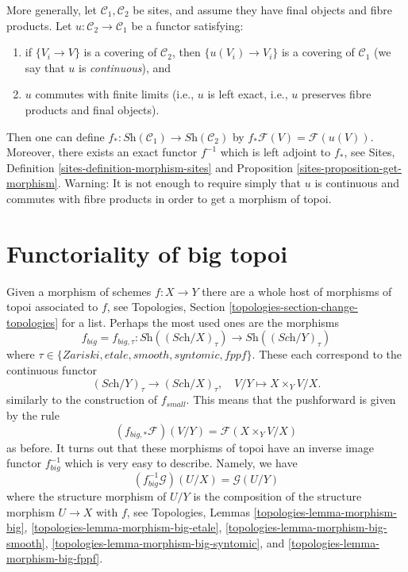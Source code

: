 \begin{remark}
\label{remark-functoriality-general}
More generally, let $\mathcal{C}_1, \mathcal{C}_2$ be sites, and
assume they have final objects and fibre products. Let
$u: \mathcal{C}_2 \to \mathcal{C}_1$ be a functor satisfying:
\begin{enumerate}
\item if $\{V_i \to V\}$ is a covering of $\mathcal{C}_2$, then
$\{u(V_i) \to V_i\}$ is a covering of $\mathcal{C}_1$ (we
say that $u$ is {\it continuous}), and
\item $u$ commutes with finite limits (i.e., $u$ is left exact, i.e.,
$u$ preserves fibre products and final objects).
\end{enumerate}
Then one can define
$f_*: \textit{Sh}(\mathcal{C}_1) \to \textit{Sh}(\mathcal{C}_2)$
by $ f_* \mathcal{F}(V) = \mathcal{F}(u(V))$.
Moreover, there exists an exact functor $f^{-1}$ which
is left adjoint to $f_*$, see
Sites, Definition \ref{sites-definition-morphism-sites} and
Proposition \ref{sites-proposition-get-morphism}.
Warning: It is not enough to require simply that $u$ is continuous
and commutes with fibre products in order to get a morphism of topoi.
\end{remark}




\section{Functoriality of big topoi}
\label{section-functoriality-big-topoi}

\noindent
Given a morphism of schemes $f : X \to Y$ there are a whole host of
morphisms of topoi associated to $f$, see
Topologies, Section \ref{topologies-section-change-topologies}
for a list. Perhaps the most used ones are the morphisms
$$
f_{big} = f_{big, \tau} :
\textit{Sh}((\textit{Sch}/X)_\tau)
\longrightarrow
\textit{Sh}((\textit{Sch}/Y)_\tau)
$$
where $\tau \in \{Zariski, etale, smooth, syntomic, fppf\}$.
These each correspond to the continuous functor
$$
(\textit{Sch}/Y)_\tau \longrightarrow (\textit{Sch}/X)_\tau,\quad
V/Y \longmapsto X \times_Y V/X.
$$
similarly to the construction of $f_{small}$. This means that the
pushforward is given by the rule
$$
(f_{big, *}\mathcal{F})(V/Y) = \mathcal{F}(X \times_Y V/X)
$$
as before. It turns out that these morphisms of topoi have an inverse
image functor $f_{big}^{-1}$ which is very easy to describe.
Namely, we have
$$
(f_{big}^{-1}\mathcal{G})(U/X) = \mathcal{G}(U/Y)
$$
where the structure morphism of $U/Y$ is the composition of the
structure morphism $U \to X$ with $f$, see
Topologies, Lemmas \ref{topologies-lemma-morphism-big},
\ref{topologies-lemma-morphism-big-etale},
\ref{topologies-lemma-morphism-big-smooth},
\ref{topologies-lemma-morphism-big-syntomic}, and
\ref{topologies-lemma-morphism-big-fppf}.







